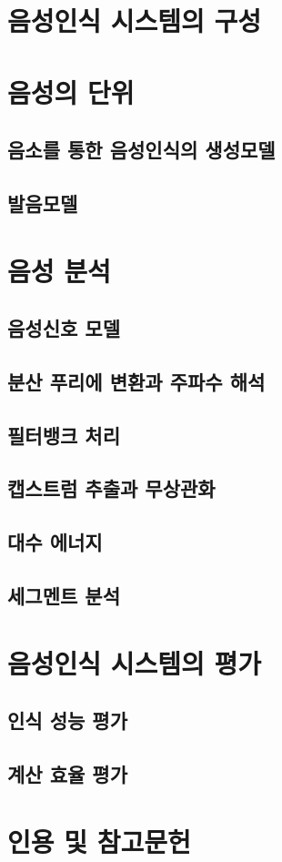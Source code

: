 \documentclass[../main.tex]{subfiles}
\begin{document}
\section{음성인식 시스템의 구성}
\section{음성의 단위}
\subsection{음소를 통한 음성인식의 생성모델}
\subsection{발음모델}
\label{subsec:pronunciation-model}

\section{음성 분석}
\subsection{음성신호 모델}
\subsection{분산 푸리에 변환과 주파수 해석}
\subsection{필터뱅크 처리}
\subsection{캡스트럼 추출과 무상관화}
\subsection{대수 에너지}
\subsection{세그멘트 분석}

\section{음성인식 시스템의 평가}
\subsection{인식 성능 평가}
\subsection{계산 효율 평가}

\section*{인용 및 참고문헌}
\end{document}
